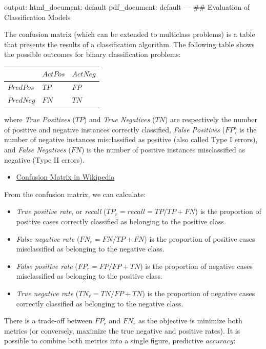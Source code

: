 \documentclass[
]{book}
\providecommand{\tightlist}{%
  \setlength{\itemsep}{0pt}\setlength{\parskip}{0pt}}
\begin{document}
output:
html\_document: default
pdf\_document: default
---
\#\# Evaluation of Classification Models

The confusion matrix (which can be extended to multiclass problems) is a table that presents the results of a classification algorithm. The following table shows the possible outcomes for binary classification problems:

\begin{longtable}[]{@{}lll@{}}
\toprule
& \(Act Pos\) & \(Act Neg\) \\
\midrule
\endhead
\(Pred Pos\) & \(TP\) & \(FP\) \\
\(Pred Neg\) & \(FN\) & \(TN\) \\
\bottomrule
\end{longtable}

where \emph{True Positives} (\(TP\)) and \emph{True Negatives} (\(TN\)) are respectively the number of positive and negative instances correctly classified, \emph{False Positives} (\(FP\)) is the number of negative instances misclassified as positive (also called Type I errors), and \emph{False Negatives} (\(FN\)) is the number of positive instances misclassified as negative (Type II errors).

\begin{itemize}
\tightlist
\item
  \href{https://en.wikipedia.org/wiki/Confusion_matrix}{Confusion Matrix in Wikipedia}
\end{itemize}

From the confusion matrix, we can calculate:

\begin{itemize}
\item
  \emph{True positive rate}, or \emph{recall } (\(TP_r = recall = TP/TP+FN\)) is the proportion of positive cases correctly classified as belonging to the positive class.
\item
  \emph{False negative rate} (\(FN_r=FN/TP+FN\)) is the proportion of positive cases misclassified as belonging to the negative class.
\item
  \emph{False positive rate} (\(FP_r=FP/FP+TN\)) is the proportion of negative cases misclassified as belonging to the positive class.
\item
  \emph{True negative rate} (\(TN_r=TN/FP+TN\)) is the proportion of negative cases correctly classified as belonging to the negative class.
\end{itemize}

There is a trade-off between \(FP_r\) and \(FN_r\) as the objective is minimize both metrics (or conversely, maximize the true negative and positive rates). It is possible to combine both metrics into a single figure, predictive \(accuracy\):
\end{document}
